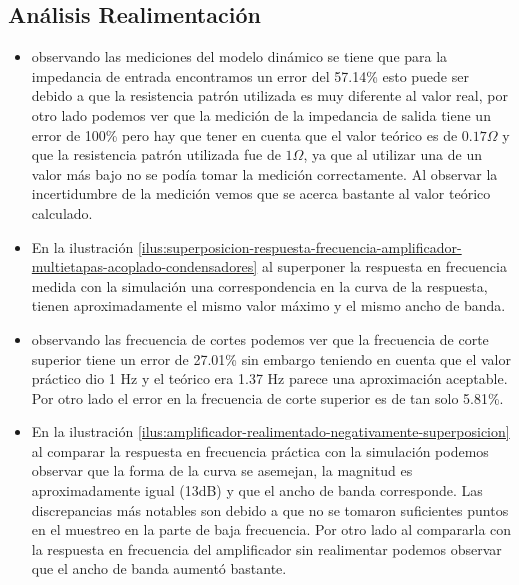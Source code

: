 \subsection{Análisis Realimentación}


\begin{itemize}
    \item observando las mediciones del modelo dinámico se tiene que para la impedancia de entrada encontramos un error del 57.14\% esto puede ser debido a que la resistencia patrón utilizada es muy diferente al valor real, por otro lado podemos ver que la medición de la impedancia de salida tiene un error de 100\% pero hay que tener en cuenta que el valor teórico es de $0.17 \Omega$ y que la resistencia patrón utilizada fue de $1 \Omega$, ya que al utilizar una de un valor más bajo no se podía tomar la medición correctamente. Al observar la incertidumbre de la medición vemos que se acerca bastante al valor teórico calculado.
    \item En la ilustración \ref{ilus:superposicion-respuesta-frecuencia-amplificador-multietapas-acoplado-condensadores} al superponer la respuesta en frecuencia medida con la simulación una correspondencia en la curva de la respuesta, tienen aproximadamente el mismo valor máximo y el mismo ancho de banda.
    \item observando las frecuencia de cortes podemos ver que la frecuencia de corte superior tiene un error de 27.01\% sin embargo teniendo en cuenta que el valor práctico dio 1 Hz y el teórico era 1.37 Hz parece una aproximación aceptable. Por otro lado el error en la frecuencia de corte superior es de tan solo 5.81\%.
    \item En la ilustración \ref{ilus:amplificador-realimentado-negativamente-superposicion} al comparar la respuesta en frecuencia práctica con la simulación podemos observar que la forma de la curva se asemejan, la magnitud es aproximadamente igual (13dB) y que el ancho de banda corresponde. Las discrepancias más notables son debido a que no se tomaron suficientes puntos en el muestreo en la parte de baja frecuencia. Por otro lado al compararla con la respuesta en frecuencia del amplificador sin realimentar podemos observar que el ancho de banda aumentó bastante. 
\end{itemize}